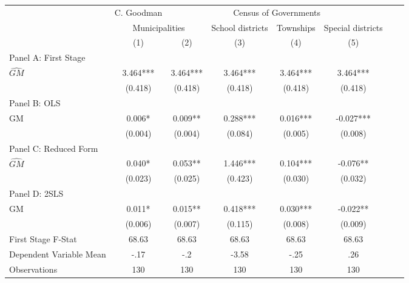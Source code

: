  \begin{tabular}{l*{7}{c}} \toprule
&\multicolumn{1}{c}{C. Goodman}&\multicolumn{4}{c}{Census of Governments}\\\cmidrule(lr){2-2}\cmidrule(lr){3-6}
&\multicolumn{2}{c}{Municipalities}&\multicolumn{1}{c}{School districts}&\multicolumn{1}{c}{Townships}&\multicolumn{1}{c}{Special districts}\\\cmidrule(lr){2-3}\cmidrule(lr){4-6}
&\multicolumn{1}{c}{(1)}&\multicolumn{1}{c}{(2)}&\multicolumn{1}{c}{(3)}&\multicolumn{1}{c}{(4)}&\multicolumn{1}{c}{(5)}\\
\cmidrule(lr){1-6}
\multicolumn{5}{l}{Panel A: First Stage}\\
\cmidrule(lr){1-6}
$\widehat{GM}$  &    3.464***&    3.464***&    3.464***&    3.464***&    3.464***\\
                &  (0.418)   &  (0.418)   &  (0.418)   &  (0.418)   &  (0.418)   \\
\cmidrule(lr){1-6}
\multicolumn{5}{l}{Panel B: OLS}\\
\cmidrule(lr){1-6}
GM              &    0.006*  &    0.009** &    0.288***&    0.016***&   -0.027***\\
                &  (0.004)   &  (0.004)   &  (0.084)   &  (0.005)   &  (0.008)   \\
\cmidrule(lr){1-6}
\multicolumn{5}{l}{Panel C: Reduced Form}\\
\cmidrule(lr){1-6}
$\widehat{GM}$  &    0.040*  &    0.053** &    1.446***&    0.104***&   -0.076** \\
                &  (0.023)   &  (0.025)   &  (0.423)   &  (0.030)   &  (0.032)   \\
\cmidrule(lr){1-6}
\multicolumn{5}{l}{Panel D: 2SLS}\\
\cmidrule(lr){1-6}
GM              &    0.011*  &    0.015** &    0.418***&    0.030***&   -0.022** \\
                &  (0.006)   &  (0.007)   &  (0.115)   &  (0.008)   &  (0.009)   \\
\midrule
First Stage F-Stat&    68.63   &    68.63   &    68.63   &    68.63   &    68.63   \\
Dependent Variable Mean&     -.17   &      -.2   &    -3.58   &     -.25   &      .26   \\
Observations    &      130   &      130   &      130   &      130   &      130   \\
 \bottomrule \end{tabular}
